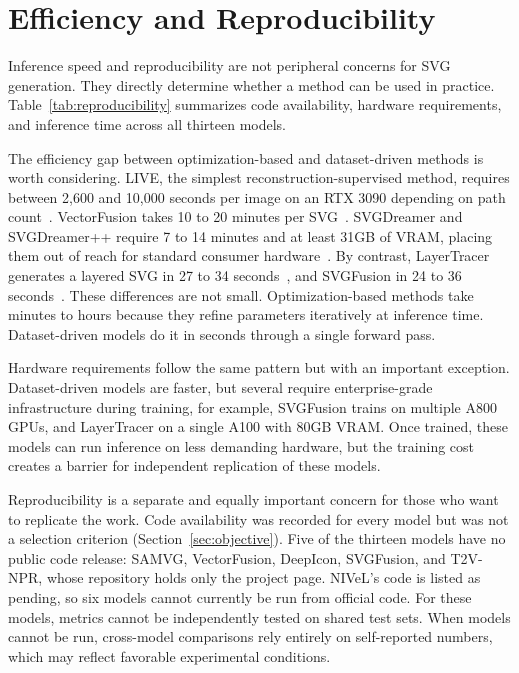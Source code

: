 \section{Efficiency and Reproducibility}
\label{sec:efficiency}

Inference speed and reproducibility are not peripheral 
concerns for SVG generation. They directly determine 
whether a method can be used in practice. 
Table~\ref{tab:reproducibility} summarizes code 
availability, hardware requirements, and inference time 
across all thirteen models.

The efficiency gap between optimization-based and 
dataset-driven methods is worth considering. LIVE, the 
simplest reconstruction-supervised method, requires 
between 2,600 and 10,000 seconds per image on an RTX 
3090 depending on path count~\cite{maLayerwiseImageVectorization2022}. 
VectorFusion takes 10 to 20 minutes per 
SVG~\cite{jainVectorFusionTexttoSVGAbstracting2022}. 
SVGDreamer and SVGDreamer++ require 7 to 14 minutes 
and at least 31GB of VRAM, placing them out of reach 
for standard consumer 
hardware~\cite{xingSVGDreamerTextGuided2024,xingSVGDreamerAdvancingEditability2025}. 
By contrast, LayerTracer generates a layered SVG in 27 
to 34 seconds~\cite{songLayerTracerCognitiveAlignedLayered2025}, 
and SVGFusion in 24 to 36 
seconds~\cite{xingSVGFusionScalableTexttoSVG2025}. These differences are not small. 
Optimization-based methods take minutes to hours because they refine parameters iteratively at inference time.
Dataset-driven models do it in seconds through a single forward pass.

Hardware requirements follow the same pattern but with 
an important exception. Dataset-driven models are faster, 
but several require enterprise-grade infrastructure during 
training, for example, SVGFusion trains on multiple A800 GPUs, and 
LayerTracer on a single A100 with 80GB VRAM. Once trained, 
these models can run inference on less demanding hardware, 
but the training cost creates a barrier for independent 
replication of these models.

Reproducibility is a separate and equally important 
concern for those who want to replicate the work.
Code availability was recorded for every model but was not 
a selection criterion (Section~\ref{sec:objective}). 
Five of the thirteen models have no public 
code release: SAMVG, VectorFusion, DeepIcon, SVGFusion, 
and T2V-NPR, whose repository holds only the project page. 
NIVeL's code is listed as pending, so six 
models cannot currently be run from official code. 
For these models, metrics cannot 
be independently tested on shared test 
sets. 
When models cannot be run, cross-model comparisons rely 
entirely on self-reported numbers, which may reflect 
favorable experimental conditions. 


